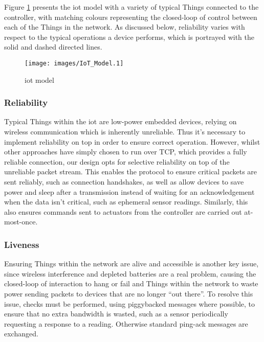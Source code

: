 \documentclass[conference]{./sty/IEEEtran}
\begin{document}
Figure \ref{fig:model} presents the iot model with a variety of typical Things connected to the controller, with matching colours representing the closed-loop of control between each of the Things in the network. As discussed below, reliability varies with respect to the typical operations a device performs, which is portrayed with the solid and dashed directed lines.

\begin{figure}[ht!]
\begin{center}
  \texttt{[image: images/IoT\_Model.1]}
\caption{iot model}
\label{fig:model}
\end{center}
\end{figure}

\subsubsection*{Reliability} %
\label{ssub:reliability}
Typical Things within the iot are low-power embedded devices, relying on wireless communication which is inherently unreliable. Thus it's necessary to implement reliability on top in order to ensure correct operation. However, whilst other approaches have simply chosen to run over TCP, which provides a fully reliable connection, our design opts for selective reliability on top of the unreliable packet stream. This enables the protocol to ensure critical packets are sent reliably, such as connection handshakes, as well as allow devices to save power and sleep after a transmission instead of waiting for an acknowledgement when the data isn't critical, such as ephemeral sensor readings. Similarly, this also ensures commands sent to actuators from the controller are carried out at-most-once.

\subsubsection*{Liveness} %
\label{ssub:liveness}
Ensuring Things within the network are alive and accessible is another key issue, since wireless interference and depleted batteries are a real problem, causing the closed-loop of interaction to hang or fail and Things within the network to waste power sending packets to devices that are no longer ``out there''. To resolve this issue, checks must be performed, using piggybacked messages where possible, to ensure that no extra bandwidth is wasted, such as a sensor periodically requesting a response to a reading. Otherwise standard ping-ack messages are exchanged.
\end{document}
